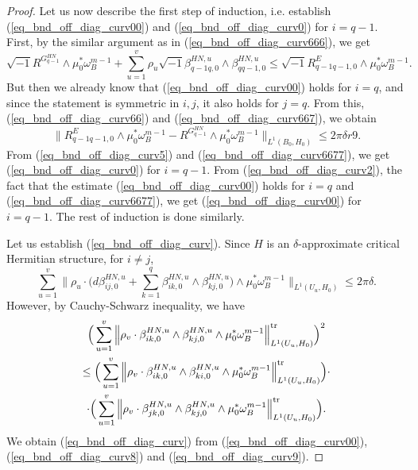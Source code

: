 \documentclass[12pt]{article}
\numberwithin{equation}{section}
\theoremstyle{theorem}
\theoremstyle{definition}
\theoremstyle{remark}
\newcommand{\imun} {\sqrt{-1}}
\begin{document}
\begin{proof}
		Let us now describe the first step of induction, i.e. establish (\ref{eq_bnd_off_diag_curv00}) and (\ref{eq_bnd_off_diag_curv0}) for $i = q - 1$.
		First, by the similar argument as in (\ref{eq_bnd_off_diag_curv666}), we get
		\begin{equation}\label{eq_bnd_off_diag_curv667}
			\imun R^{G_{q-1}^{HN}} \wedge \mu_0^* \omega_B^{m - 1}
			+
			\sum_{u = 1}^{v} \rho_u \imun \beta_{q-1 q, 0}^{HN, u} \wedge \beta_{q q-1, 0}^{HN, u}
			\leq
			\imun R^E_{q-1 q-1, 0} \wedge \mu_0^* \omega_B^{m - 1}.
		\end{equation}
		But then we already know that (\ref{eq_bnd_off_diag_curv00}) holds for $i = q$, and since the statement is symmetric in $i, j$, it also holds for $j = q$.
		From this, (\ref{eq_bnd_off_diag_curv66}) and (\ref{eq_bnd_off_diag_curv667}), we obtain 
		\begin{equation}\label{eq_bnd_off_diag_curv6677}
			\Big\|
				R^E_{q-1 q-1, 0} \wedge \mu_0^* \omega_B^{m - 1}
				-
				R^{G_{q-1}^{HN}} \wedge \mu_0^* \omega_B^{m - 1}
			\Big\|_{L^1(B_0, H_0)}
			\leq
			2 \pi \delta r 9.			
		\end{equation}
		From (\ref{eq_bnd_off_diag_curv5}) and (\ref{eq_bnd_off_diag_curv6677}), we get (\ref{eq_bnd_off_diag_curv0}) for $i = q - 1$.
		From (\ref{eq_bnd_off_diag_curv2}), the fact that the estimate (\ref{eq_bnd_off_diag_curv00}) holds for $i = q$ and (\ref{eq_bnd_off_diag_curv6677}), we get (\ref{eq_bnd_off_diag_curv00}) for $i = q - 1$.
		The rest of induction is done similarly.
		\par 
		Let us establish (\ref{eq_bnd_off_diag_curv}).
		Since $H$ is an $\delta$-approximate critical Hermitian structure, for $i \neq j$,
		\begin{equation}\label{eq_bnd_off_diag_curv8}
			\sum_{u = 1}^{v}
			\Big\| \rho_u \cdot \Big( d \beta_{i j, 0}^{HN, u} + \sum_{k = 1}^q \beta_{i k, 0}^{HN, u} \wedge \beta_{k j, 0}^{HN, u} \Big)  \wedge \mu_0^* \omega_B^{m - 1} \Big\|_{L^1(U_u, H_0)}
			\leq
			2 \pi \delta.
		\end{equation}
		However, by Cauchy-Schwarz inequality, we have
		\begin{multline}\label{eq_bnd_off_diag_curv9}
			\Big( \sum_{u = 1}^{v} \Big\| \rho_v \cdot \beta_{i k, 0}^{HN, u} \wedge \beta_{k j, 0}^{HN, u}  \wedge \mu_0^* \omega_B^{m - 1} \Big\|_{L^1(U_u, H_0)}^{{\rm{tr}}} \Big)^2
			\\
			\leq
			\Big( \sum_{u = 1}^{v} 
			\Big\| \rho_v \cdot \beta_{i k, 0}^{HN, u} \wedge \beta_{k i, 0}^{HN, u} \wedge \mu_0^* \omega_B^{m - 1} \Big\|_{L^1(U_u, H_0)}^{{\rm{tr}}}
			\Big)
			\cdot
			\\
			\cdot
			\Big( \sum_{u = 1}^{v} 
			\Big\| \rho_v \cdot \beta_{j k, 0}^{HN, u} \wedge \beta_{k j, 0}^{HN, u} \wedge \mu_0^* \omega_B^{m - 1} \Big\|_{L^1(U_u, H_0)}^{{\rm{tr}}}
			\Big).
		\end{multline}
		We obtain (\ref{eq_bnd_off_diag_curv}) from (\ref{eq_bnd_off_diag_curv00}), (\ref{eq_bnd_off_diag_curv8}) and (\ref{eq_bnd_off_diag_curv9}).
	\end{proof}
\end{document}

